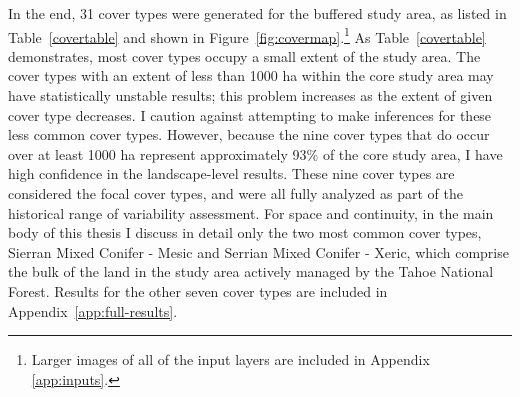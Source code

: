In the end, 31 cover types were generated for the buffered study area, as listed in Table~\ref{covertable} and shown in Figure~\ref{fig:covermap}.\footnote{Larger images of all of the input layers are included in Appendix \ref{app:inputs}.} %
As Table~\ref{covertable} demonstrates, most cover types occupy a small extent of the study area. The cover types with an extent of less than 1000 ha within the core study area may have statistically unstable results; this problem increases as the extent of given cover type decreases. I caution against attempting to make inferences for these less common cover types. However, because the nine cover types that do occur over at least 1000 ha represent approximately 93\% of the core study area, I have high confidence in the landscape-level results. These nine cover types are considered the focal cover types, and were all fully analyzed as part of the historical range of variability assessment. For space and continuity, in the main body of this thesis I discuss in detail only the two most common cover types, Sierran Mixed Conifer - Mesic and Serrian Mixed Conifer - Xeric, which comprise the bulk of the land in the study area actively managed by the Tahoe National Forest. Results for the other seven cover types are included in Appendix~\ref{app:full-results}. 






